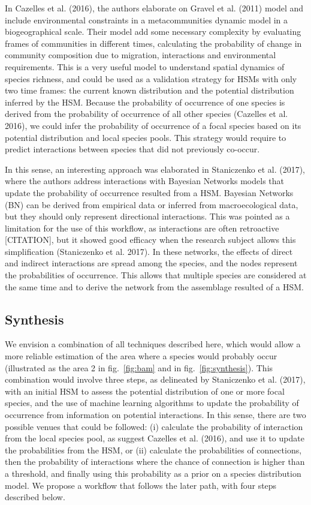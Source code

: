 \documentclass[12pt]{article}
\begin{document}
In Cazelles et al. (2016), the authors elaborate on Gravel et al. (2011)
model and include environmental constraints in a metacommunities dynamic
model in a biogeographical scale. Their model add some necessary
complexity by evaluating frames of communities in different times,
calculating the probability of change in community composition due to
migration, interactions and environmental requirements. This is a very
useful model to understand spatial dynamics of species richness, and
could be used as a validation strategy for HSMs with only two time
frames: the current known distribution and the potential distribution
inferred by the HSM. Because the probability of occurrence of one
species is derived from the probability of occurrence of all other
species (Cazelles et al. 2016), we could infer the probability of
occurrence of a focal species based on its potential distribution and
local species pools. This strategy would require to predict interactions
between species that did not previously co-occur.

In this sense, an interesting approach was elaborated in Staniczenko et
al. (2017), where the authors address interactions with Bayesian
Networks models that update the probability of occurrence resulted from
a HSM. Bayesian Networks (BN) can be derived from empirical data or
inferred from macroecological data, but they should only represent
directional interactions. This was pointed as a limitation for the use
of this workflow, as interactions are often retroactive {[}CITATION{]},
but it showed good efficacy when the research subject allows this
simplification (Staniczenko et al. 2017). In these networks, the effects
of direct and indirect interactions are spread among the species, and
the nodes represent the probabilities of occurrence. This allows that
multiple species are considered at the same time and to derive the
network from the assemblage resulted of a HSM.

\hypertarget{synthesis}{%
\subsection{Synthesis}\label{synthesis}}

We envision a combination of all techniques described here, which would
allow a more reliable estimation of the area where a species would
probably occur (illustrated as the area 2 in fig.~\ref{fig:bam} and in
fig.~\ref{fig:synthesis}). This combination would involve three steps,
as delineated by Staniczenko et al. (2017), with an initial HSM to
assess the potential distribution of one or more focal species, and the
use of machine learning algorithms to update the probability of
occurrence from information on potential interactions. In this sense,
there are two possible venues that could be followed: (i) calculate the
probability of interaction from the local species pool, as suggest
Cazelles et al. (2016), and use it to update the probabilities from the
HSM, or (ii) calculate the probabilities of connections, then the
probability of interactions where the chance of connection is higher
than a threshold, and finally using this probability as a prior on a
species distribution model. We propose a workflow that follows the later
path, with four steps described below.
\end{document}
